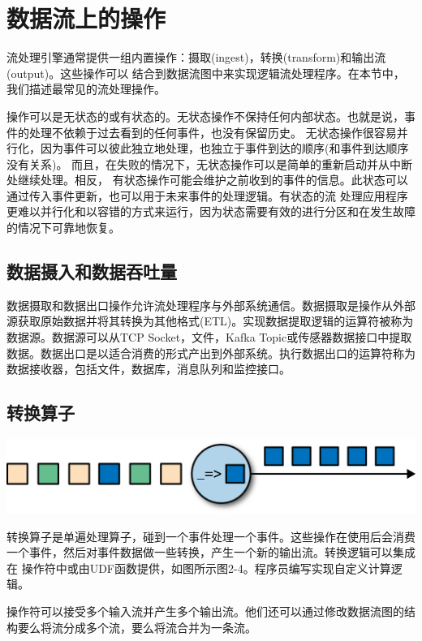 \documentclass[oneside]{ctexbook}
\begin{document}
\section{数据流上的操作}

流处理引擎通常提供一组内置操作：摄取(ingest)，转换(transform)和输出流(output)。这些操作可以
结合到数据流图中来实现逻辑流处理程序。在本节中，我们描述最常见的流处理操作。

操作可以是无状态的或有状态的。无状态操作不保持任何内部状态。也就是说，事件的处理不依赖于过去看到的任何事件，也没有保留历史。
无状态操作很容易并行化，因为事件可以彼此独立地处理，也独立于事件到达的顺序(和事件到达顺序没有关系)。
而且，在失败的情况下，无状态操作可以是简单的重新启动并从中断处继续处理。相反，
有状态操作可能会维护之前收到的事件的信息。此状态可以通过传入事件更新，也可以用于未来事件的处理逻辑。有状态的流
处理应用程序更难以并行化和以容错的方式来运行，因为状态需要有效的进行分区和在发生故障的情况下可靠地恢复。

\subsection{数据摄入和数据吞吐量}

数据摄取和数据出口操作允许流处理程序与外部系统通信。数据摄取是操作从外部源获取原始数据并将其转换为其他格式(ETL)。实现数据提取逻辑的运算符被称为数据源。数据源可以从TCP
Socket，文件，Kafka Topic或传感器数据接口中提取数据。数据出口是以适合消费的形式产出到外部系统。执行数据出口的运算符称为数据接收器，包括文件，数据库，消息队列和监控接口。

\subsection{转换算子}

\noindent\includegraphics[width=\textwidth]{spaf_0204.png}

转换算子是单遍处理算子，碰到一个事件处理一个事件。这些操作在使用后会消费一个事件，然后对事件数据做一些转换，产生一个新的输出流。转换逻辑可以集成在
操作符中或由UDF函数提供，如图所示图2-4。程序员编写实现自定义计算逻辑。

操作符可以接受多个输入流并产生多个输出流。他们还可以通过修改数据流图的结构要么将流分成多个流，要么将流合并为一条流。
\end{document}
